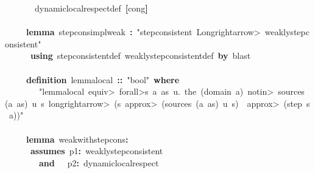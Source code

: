 \documentclass{article}
\newcommand{\syntaxKEYWORDA}[1]{\textcolor[rgb]{0.0,0.4,0.6}{\textbf{#1}}}
\newcommand{\syntaxKEYWORDB}[1]{\textcolor[rgb]{0.0,0.6,0.4}{\textbf{#1}}}
\newcommand{\syntaxLITERALA}[1]{\textcolor[rgb]{1.0,0.0,0.8}{#1}}
\newcommand{\syntaxOPERATOR}[1]{\textcolor[rgb]{0.0,0.0,0.0}{\textbf{#1}}}
\newcommand{\syntaxKEYWORDA}[1]{\textcolor[rgb]{0.0,0.4,0.6}{\textbf{#1}}}
\newcommand{\syntaxKEYWORDB}[1]{\textcolor[rgb]{0.0,0.6,0.4}{\textbf{#1}}}
\newcommand{\syntaxLITERALA}[1]{\textcolor[rgb]{1.0,0.0,0.8}{#1}}
\newcommand{\syntaxOPERATOR}[1]{\textcolor[rgb]{0.0,0.0,0.0}{\textbf{#1}}}
\newcommand{\syntaxKEYWORDA}[1]{\textcolor[rgb]{0.0,0.4,0.6}{\textbf{#1}}}
\newcommand{\syntaxKEYWORDB}[1]{\textcolor[rgb]{0.0,0.6,0.4}{\textbf{#1}}}
\newcommand{\syntaxLITERALA}[1]{\textcolor[rgb]{1.0,0.0,0.8}{#1}}
\newcommand{\syntaxOPERATOR}[1]{\textcolor[rgb]{0.0,0.0,0.0}{\textbf{#1}}}
\newcommand{\syntaxKEYWORDA}[1]{\textcolor[rgb]{0.0,0.4,0.6}{#1}}
\newcommand{\syntaxKEYWORDB}[1]{\textcolor[rgb]{0.0,0.6,0.4}{#1}}
\newcommand{\syntaxLITERALA}[1]{\textcolor[rgb]{1.0,0.0,0.8}{\textbf{#1}}}
\newcommand{\syntaxOPERATOR}[1]{\textcolor[rgb]{0.0,0.0,0.0}{#1}}
\newcommand{\syntaxKEYWORDA}[1]{\textcolor[rgb]{0.0,0.4,0.6}{\textbf{#1}}}
\newcommand{\syntaxKEYWORDB}[1]{\textcolor[rgb]{0.0,0.6,0.4}{\textbf{#1}}}
\newcommand{\syntaxLITERALA}[1]{\textcolor[rgb]{1.0,0.0,0.8}{#1}}
\newcommand{\syntaxOPERATOR}[1]{\textcolor[rgb]{0.0,0.0,0.0}{\textbf{#1}}}
\newcommand{\syntaxKEYWORDA}[1]{\textcolor[rgb]{0.0,0.4,0.6}{\textbf{#1}}}
\newcommand{\syntaxKEYWORDB}[1]{\textcolor[rgb]{0.0,0.6,0.4}{\textbf{#1}}}
\newcommand{\syntaxLITERALA}[1]{\textcolor[rgb]{1.0,0.0,0.8}{#1}}
\newcommand{\syntaxOPERATOR}[1]{\textcolor[rgb]{0.0,0.0,0.0}{\textbf{#1}}}
\begin{document}
{\ }{\ }{\ }{\ }{\ }{\ }{\ }dynamic\usebox{\underscorebox}local\usebox{\underscorebox}respect\usebox{\underscorebox}def{\ }\syntaxOPERATOR{{[}}cong\syntaxOPERATOR{{]}}\hspace*{\fill}\\
\hspace*{\fill}\\
{\ }{\ }{\ }{\ }{\ }\syntaxKEYWORDA{lemma}{\ }step\usebox{\underscorebox}cons\usebox{\underscorebox}impl\usebox{\underscorebox}weak{\ }\syntaxOPERATOR{:}{\ }\syntaxLITERALA{"step\usebox{\underscorebox}consistent{\ }\<Longrightarrow>{\ }weakly\usebox{\underscorebox}step\usebox{\underscorebox}consistent"}\hspace*{\fill}\\
{\ }{\ }{\ }{\ }{\ }{\ }\syntaxKEYWORDA{using}{\ }step\usebox{\underscorebox}consistent\usebox{\underscorebox}def{\ }weakly\usebox{\underscorebox}step\usebox{\underscorebox}consistent\usebox{\underscorebox}def{\ }\syntaxKEYWORDA{by}{\ }blast\hspace*{\fill}\\
\hspace*{\fill}\\
{\ }{\ }{\ }{\ }{\ }\syntaxKEYWORDA{definition}{\ }lemma\usebox{\underscorebox}local{\ }\syntaxOPERATOR{::}{\ }\syntaxLITERALA{"bool"}{\ }\syntaxKEYWORDB{where}\hspace*{\fill}\\
{\ }{\ }{\ }{\ }{\ }{\ }{\ }{\ }\syntaxLITERALA{"lemma\usebox{\underscorebox}local{\ }\<equiv>{\ }\<forall>s{\ }a{\ }as{\ }u.{\ }the{\ }(domain{\ }a){\ }\<notin>{\ }sources{\ }(a{\ }\usebox{\hashbox}{\ }as){\ }u{\ }s{\ }\<longrightarrow>{\ }(s{\ }\<approx>{\ }(sources{\ }(a{\ }\usebox{\hashbox}{\ }as){\ }u{\ }s){\ }{\ }\<approx>{\ }(step{\ }s{\ }a))"}\hspace*{\fill}\\
\hspace*{\fill}\\
{\ }{\ }{\ }{\ }{\ }\syntaxKEYWORDA{lemma}{\ }weak\usebox{\underscorebox}with\usebox{\underscorebox}step\usebox{\underscorebox}cons\syntaxOPERATOR{:}\hspace*{\fill}\\
{\ }{\ }{\ }{\ }{\ }{\ }\syntaxKEYWORDB{assumes}{\ }p1\syntaxOPERATOR{:}{\ }weakly\usebox{\underscorebox}step\usebox{\underscorebox}consistent\hspace*{\fill}\\
{\ }{\ }{\ }{\ }{\ }{\ }{\ }{\ }\syntaxKEYWORDB{and}{\ }{\ }{\ }p2\syntaxOPERATOR{:}{\ }dynamic\usebox{\underscorebox}local\usebox{\underscorebox}respect\hspace*{\fill}\\
\end{document}
